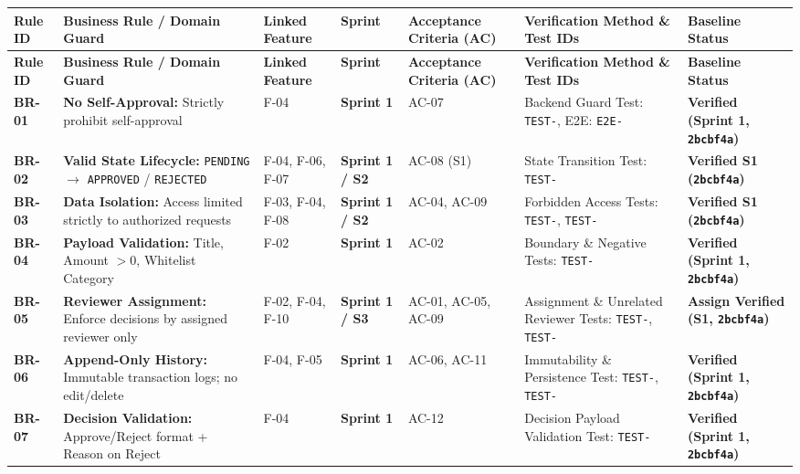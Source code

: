 \documentclass[11pt,a4paper]{article}
\begin{document}
\small
\vspace{0.3em}
\begin{longtable}{|>{\RaggedRight}p{1.3cm}|>{\RaggedRight}p{2.8cm}|>{\centering\arraybackslash}p{1.3cm}|>{\centering\arraybackslash}p{1.4cm}|>{\RaggedRight}p{2.4cm}|>{\RaggedRight}p{2.6cm}|>{\RaggedRight}p{2.1cm}|}
\hline
\rowcolor{zenPale}\textbf{Rule ID} & \textbf{Business Rule / Domain Guard} & \textbf{Linked Feature} & \textbf{Sprint} & \textbf{Acceptance Criteria (AC)} & \textbf{Verification Method \& Test IDs} & \textbf{Baseline Status} \\ \hline
\endfirsthead
\hline
\rowcolor{zenPale}\textbf{Rule ID} & \textbf{Business Rule / Domain Guard} & \textbf{Linked Feature} & \textbf{Sprint} & \textbf{Acceptance Criteria (AC)} & \textbf{Verification Method \& Test IDs} & \textbf{Baseline Status} \\ \hline
\endhead
\hline
\endfoot
\textbf{BR-01} & \textbf{No Self-Approval:} Strictly prohibit self-approval & F-04 & \textbf{Sprint 1} & AC-07 & Backend Guard Test: \texttt{TEST-\allowbreak 08}, E2E: \texttt{E2E-\allowbreak 03} & \textbf{Verified (Sprint 1, \texttt{2bcbf4a})} \\ \hline
\textbf{BR-02} & \textbf{Valid State Lifecycle:} \texttt{PENDING} $\rightarrow$ \texttt{APPROVED} / \texttt{REJECTED} & F-04, F-06, F-07 & \textbf{Sprint 1 / S2} & AC-08 (S1) & State Transition Test: \texttt{TEST-\allowbreak 09} & \textbf{Verified S1 (\texttt{2bcbf4a})} \\ \hline
\textbf{BR-03} & \textbf{Data Isolation:} Access limited strictly to authorized requests & F-03, F-04, F-08 & \textbf{Sprint 1 / S2} & AC-04, AC-09 & Forbidden Access Tests: \texttt{TEST-\allowbreak 04}, \texttt{TEST-\allowbreak 11} & \textbf{Verified S1 (\texttt{2bcbf4a})} \\ \hline
\textbf{BR-04} & \textbf{Payload Validation:} Title, Amount $> 0$, Whitelist Category & F-02 & \textbf{Sprint 1} & AC-02 & Boundary \& Negative Tests: \texttt{TEST-\allowbreak 02} & \textbf{Verified (Sprint 1, \texttt{2bcbf4a})} \\ \hline
\textbf{BR-05} & \textbf{Reviewer Assignment:} Enforce decisions by assigned reviewer only & F-02, F-04, F-10 & \textbf{Sprint 1 / S3} & AC-01, AC-05, AC-09 & Assignment \& Unrelated Reviewer Tests: \texttt{TEST-\allowbreak 05}, \texttt{TEST-\allowbreak 11} & \textbf{Assign Verified (S1, \texttt{2bcbf4a})} \\ \hline
\textbf{BR-06} & \textbf{Append-Only History:} Immutable transaction logs; no edit/delete & F-04, F-05 & \textbf{Sprint 1} & AC-06, AC-11 & Immutability \& Persistence Test: \texttt{TEST-\allowbreak 06}, \texttt{TEST-\allowbreak 13} & \textbf{Verified (Sprint 1, \texttt{2bcbf4a})} \\ \hline
\textbf{BR-07} & \textbf{Decision Validation:} Approve/Reject format + Reason on Reject & F-04 & \textbf{Sprint 1} & AC-12 & Decision Payload Validation Test: \texttt{TEST-\allowbreak 12} & \textbf{Verified (Sprint 1, \texttt{2bcbf4a})} \\ \hline
\end{longtable}
\vspace{0.3em}
\end{document}
